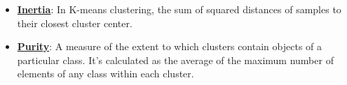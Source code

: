 \documentclass{article}%
\begin{document}
\begin{itemize}[leftmargin=*]
\item \href{https://purdue.brightspace.com/d2l/common/assets/pdfjs-d2l-dist/1.0.14-legacy/web/viewer.html?file=%2Fcontent%2Fenforced%2F1095467-wl.202510.CS.24300.001%2F12L2-distance-clusters.pdf%3Fou%3D1095467&lang=en-us&container=d2l-fileviewer-rendered-pdf&fullscreen=d2l-fileviewer-rendered-pdf-dialog&height=667#page=33}{\textbf{Inertia}}: In K-means clustering, the sum of squared distances of samples to their closest cluster center.%
\item \href{https://purdue.brightspace.com/d2l/common/assets/pdfjs-d2l-dist/1.0.14-legacy/web/viewer.html?file=%2Fcontent%2Fenforced%2F1095467-wl.202510.CS.24300.001%2F12L2-distance-clusters.pdf%3Fou%3D1095467&lang=en-us&container=d2l-fileviewer-rendered-pdf&fullscreen=d2l-fileviewer-rendered-pdf-dialog&height=667#page=44}{\textbf{Purity}}: A measure of the extent to which clusters contain objects of a particular class. It's calculated as the average of the maximum number of elements of any class within each cluster.%
\end{itemize}

%
\end{document}
